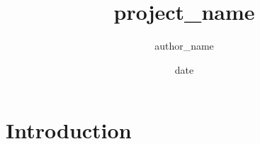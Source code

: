 \documentclass{article}
\title{{project_name}}
\author{{author_name}}
\date{{date}}
\begin{document}
\maketitle

\section{Introduction}
\end{document}
